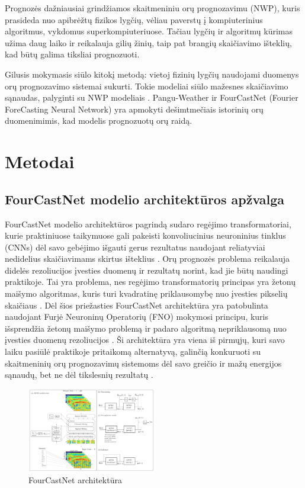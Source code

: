 \documentclass[conference]{IEEEtran}
\begin{document}
Prognozės dažniausiai grindžiamos skaitmeniniu orų prognozavimu (NWP), kuris prasideda nuo apibrėžtų fizikos lygčių, vėliau paverstų į kompiuterinius algoritmus, vykdomus superkompiuteriuose. Tačiau lygčių ir algoritmų kūrimas užima daug laiko ir reikalauja gilių žinių, taip pat brangių skaičiavimo išteklių, kad būtų galima tiksliai prognozuoti.

Gilusis mokymasis siūlo kitokį metodą: vietoj fizinių lygčių naudojami duomenys orų prognozavimo sistemai sukurti. Tokie modeliai siūlo mažesnes skaičiavimo sąnaudas, palyginti su NWP modeliais \cite{schultz2021}. Pangu-Weather \cite{bi2023accurate} ir FourCastNet  (Fourier ForeCasting Neural Network) \cite{pathak2022fourcastnet} yra apmokyti dešimtmečiais istorinių orų duomenimimis, kad modelis prognozuotų orų raidą. 

\section{Metodai}


\subsection{FourCastNet modelio architektūros apžvalga}

FourCastNet modelio architektūros pagrindą sudaro regėjimo transformatoriai, kurie praktiniuose taikymuose gali pakeisti konvoliucinius neuroninius tinklus (CNNs) dėl savo gebėjimo išgauti gerus rezultatus naudojant reliatyviai nedidelius skaičiavimams skirtus išteklius \cite{dosovitskiy2020image}. Orų prognozės problema reikalauja didelės rezoliucijos įvesties duomenų ir rezultatų norint, kad jie būtų naudingi praktikoje. Tai yra problema, nes regėjimo transformatorių principas yra žetonų maišymo algoritmas, kuris turi kvadratinę priklausomybę nuo įvesties pikselių skaičiaus \cite{guibas2021adaptive}. Dėl šios priežasties FourCastNet architektūra yra patobulinta naudojant Furjė Neuroninų Operatorių (FNO) mokymosi principu, kuris išsprendžia žetonų maišymo problemą ir padaro algoritmą nepriklausomą nuo įvesties duomenų rezoliucijos \cite{guibas2021adaptive}. Ši architektūra yra viena iš pirmųjų, kuri savo laiku pasiūlė praktikoje pritaikomą alternatyvą, galinčią konkuruoti su skaitmeninių orų prognozavimų sistemoms dėl savo greičio ir mažų energijos sąnaudų, bet ne dėl tikslesnių rezultatų  \cite{pathak2022fourcastnet}.

\begin{figure}[htb!] %
\centerline{\includegraphics[width=0.5\textwidth]{img/fourcastnet-architecture.png}}
\caption{FourCastNet architektūra}
\label{fig1}
\end{figure}
\end{document}
